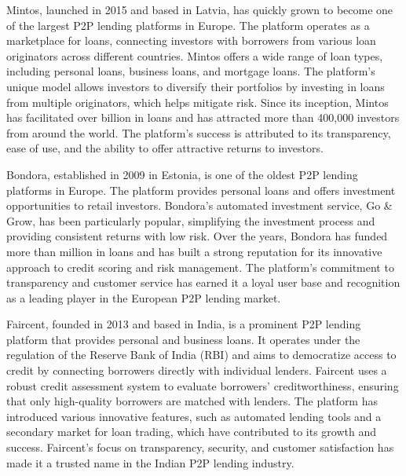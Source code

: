 \documentclass{article}
\begin{document}
Mintos, launched in 2015 and based in Latvia, has quickly grown to become one of the largest P2P lending platforms in Europe. The platform operates as a marketplace for loans, connecting investors with borrowers from various loan originators across different countries. Mintos offers a wide range of loan types, including personal loans, business loans, and mortgage loans. The platform's unique model allows investors to diversify their portfolios by investing in loans from multiple originators, which helps mitigate risk. Since its inception, Mintos has facilitated over  billion in loans and has attracted more than 400,000 investors from around the world. The platform's success is attributed to its transparency, ease of use, and the ability to offer attractive returns to investors.

Bondora, established in 2009 in Estonia, is one of the oldest P2P lending platforms in Europe. The platform provides personal loans and offers investment opportunities to retail investors. Bondora's automated investment service, Go \& Grow, has been particularly popular, simplifying the investment process and providing consistent returns with low risk. Over the years, Bondora has funded more than  million in loans and has built a strong reputation for its innovative approach to credit scoring and risk management. The platform's commitment to transparency and customer service has earned it a loyal user base and recognition as a leading player in the European P2P lending market.

Faircent, founded in 2013 and based in India, is a prominent P2P lending platform that provides personal and business loans. It operates under the regulation of the Reserve Bank of India (RBI) and aims to democratize access to credit by connecting borrowers directly with individual lenders. Faircent uses a robust credit assessment system to evaluate borrowers' creditworthiness, ensuring that only high-quality borrowers are matched with lenders. The platform has introduced various innovative features, such as automated lending tools and a secondary market for loan trading, which have contributed to its growth and success. Faircent's focus on transparency, security, and customer satisfaction has made it a trusted name in the Indian P2P lending industry.
\end{document}
